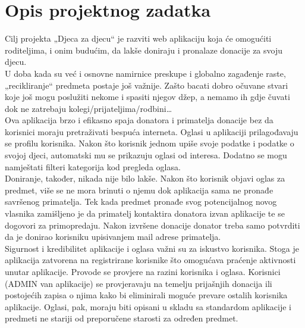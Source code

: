 \chapter{Opis projektnog zadatka}
		
		
		Cilj projekta „Djeca za djecu“ je razviti web aplikaciju koja će omogućiti roditeljima, i onim budućim, da lakše doniraju i pronalaze donacije za svoju djecu. \\
		\newline
		U doba kada su već i osnovne namirnice preskupe i globalno zagađenje raste, „recikliranje“ predmeta postaje još važnije. Zašto bacati dobro očuvane stvari koje još mogu poslužiti nekome i spasiti njegov džep, a nemamo ih gdje čuvati dok ne zatrebaju kolegi/prijateljima/rodbini…  \\
		\newline
		Ova aplikacija brzo i efikasno spaja donatora i primatelja donacije bez da korisnici moraju pretraživati bespuća interneta. Oglasi u aplikaciji prilagođavaju se profilu korisnika. Nakon što korisnik jednom upiše svoje podatke i podatke o svojoj djeci, automatski mu se prikazuju oglasi od interesa. Dodatno se mogu namještati filteri kategorija kod pregleda oglasa. \\
		\newline
		Doniranje, također, nikada nije bilo lakše. Nakon što korisnik objavi oglas za predmet, više se ne mora brinuti o njemu dok aplikacija sama ne pronađe savršenog primatelja. Tek kada predmet pronađe svog potencijalnog novog vlasnika zamišljeno je da primatelj kontaktira donatora izvan aplikacije te se dogovori za primopredaju. Nakon izvršene donacije donator treba samo potvrditi da je donirao korisniku upisivanjem mail adrese primatelja.\\
		\newline
		Sigurnost i kredibilitet aplikacije i oglasa važni su za iskustvo korisnika. Stoga je aplikacija zatvorena na registrirane korisnike što omogućava praćenje aktivnosti unutar aplikacije. Provode se provjere na razini korisnika i oglasa. Korisnici (ADMIN van aplikacije) se provjeravaju na temelju prijašnjih donacija ili postojećih zapisa o njima kako bi eliminirali moguće prevare ostalih korisnika aplikacije. Oglasi, pak, moraju biti opisani u skladu sa standardom aplikacije i predmeti ne stariji od preporučene starosti za određen predmet.
		\newline

